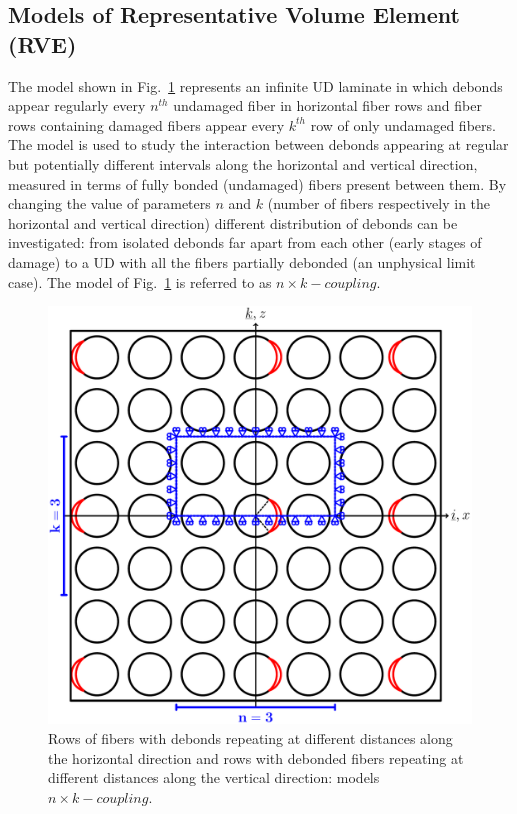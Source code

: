 \documentclass[review]{elsarticle}
\begin{document}
\subsection{Models of Representative Volume Element (RVE)}\label{subsec:rve}

The model shown in Fig.~\ref{fig:laminateModelsA} represents an infinite UD laminate in which debonds appear regularly every $n^{th}$ undamaged fiber in horizontal fiber rows and fiber rows containing damaged fibers appear every $k^{th}$ row of only undamaged fibers. The model is used to study the interaction between debonds appearing at regular but potentially different intervals along the horizontal and vertical direction, measured in terms of fully bonded (undamaged) fibers present between them. By changing the value of parameters $n$ and $k$ (number of fibers respectively in the horizontal and vertical direction) different distribution of debonds can be investigated: from isolated debonds far apart from each other (early stages of damage) to a UD with all the fibers partially debonded (an unphysical limit case). The model of Fig.~\ref{fig:laminateModelsA} is referred to as $n\times k-coupling$.

\begin{figure}[!h]
\centering
\includegraphics[width=\textwidth]{chesstableArrangement.pdf}
\caption{Rows of fibers with debonds repeating at different distances along the horizontal direction and rows with debonded fibers repeating at different distances along the vertical direction: models $n\times k-coupling$.}\label{fig:laminateModelsA}
\end{figure}
\end{document}
